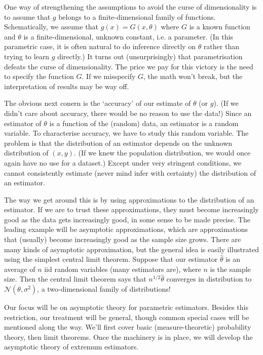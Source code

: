 \documentclass[11pt,letterpaper,reqno,oneside]{article}
\begin{document}
One way of strengthening the assumptions to avoid the curse of dimensionality is to assume that $g$ belongs to a finite-dimensional family of functions. Schematically, we assume that $g(x) = G(x,\theta)$ where $G$ is a known function and $\theta$ is a finite-dimensional, unknown constant, i.e. a parameter. (In this parametric case, it is often natural to do inference directly on $\theta$ rather than trying to learn $g$ directly.) It turns out (unsurprisingly) that parametrisation defeats the curse of dimensionality. The price we pay for this victory is the need to specify the function $G$. If we misspecify $G$, the math won't break, but the interpretation of results may be way off.

The obvious next conern is the `accuracy' of our estimate of $\theta$ (or $g$). (If we didn't care about accuracy, there would be no reason to use the data!) Since an estimator of $\theta$ is a function of the (random) data, an estimator is a random variable. To characterise accuracy, we have to study this random variable. The problem is that the distribution of an estimator depends on the unknown distribution of $(x,y)$. (If we knew the population distribution, we would once again have no use for a dataset.) Except under very stringent conditions, we cannot consistently estimate (never mind infer with certainty) the distribution of an estimator.

The way we get around this is by using approximations to the distribution of an estimator. If we are to trust these approximations, they must become increasingly good as the data gets increasingly good, in some sense to be made precise. The leading example will be asymptotic approximations, which are approximations that (usually) become increasingly good as the sample size grows. There are many kinds of asymptotic approximation, but the general idea is easily illustrated using the simplest central limit theorem. Suppose that our estimator $\widehat{\theta}$ is an average of $n$ iid random variables (many estimators are), where $n$ is the sample size. Then the central limit theorem says that $n^{1/2} \widehat{\theta}$ converges in distribution to $\mathcal{N}\left(\theta,\sigma^2\right)$, a two-dimensional family of distributions!

Our focus will be on asymptotic theory for parametric estimators. Besides this restriction, our treatment will be general, though common special cases will be mentioned along the way. We'll first cover basic (measure-theoretic) probability theory, then limit theorems. Once the machinery is in place, we will develop the asymptotic theory of extremum estimators.
\end{document}
